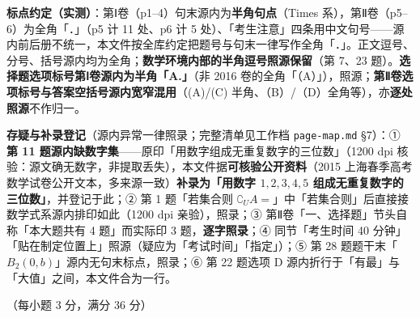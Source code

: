 \begin{gktip}
\textbf{标点约定（实测）}：第Ⅰ卷（p1–4）句末源内为\textbf{半角句点}（Times 系），第Ⅱ卷（p5–6）为全角「．」（p5 计 11 处、p6 计 5 处）、「考生注意」四条用中文句号——源内前后册不统一，本文件按全库约定把题号与句末一律写作全角「．」。正文逗号、分号、括号源内均为全角；\textbf{数学环境内部的半角逗号照源保留}（第 7、23 题）。\textbf{选择题选项标号第Ⅰ卷源内为半角「A.」}（非 2016 卷的全角「（A）」），照源；\textbf{第Ⅱ卷选项标号与答案空括号源内宽窄混用}（(A)/(C) 半角、（B）/（D）全角等），亦\textbf{逐处照源}不作归一。

\textbf{存疑与补录登记}（源内异常一律照录；完整清单见工作档 \texttt{page-map.md} §7）：① \textbf{第 11 题源内缺数字集}——原印「用数字组成无重复数字的三位数」（1200 dpi 核验：源文确无数字，非提取丢失），本文件据\textbf{可核验公开资料}（2015 上海春季高考数学试卷公开文本，多来源一致）\textbf{补录为「用数字 \(1,2,3,4,5\) 组成无重复数字的三位数」}，并登记于此；② 第 1 题「若集合则 \(\complement_{U}A=\)\gkblank{}」中「若集合则」后直接接数学式系源内排印如此（1200 dpi 亲验），照录；③ 第Ⅱ卷「一、选择题」节头自称「本大题共有 4 题」而实际印 3 题，\textbf{逐字照录}；④ 同节「考生时间 40 分钟」「贴在制定位置上」照源（疑应为「考试时间」「指定」）；⑤ 第 28 题题干末「\(B_{2}(0,b)\)」源内无句末标点，照录；⑥ 第 22 题选项 D 源内折行于「有最」与「大值」之间，本文件合为一行。
\end{gktip}



（每小题 3 分，满分 36 分）

